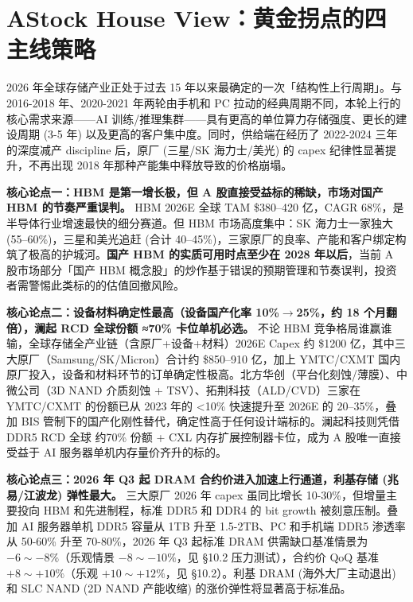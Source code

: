 
\section{AStock House View：黄金拐点的四主线策略}

2026 年全球存储产业正处于过去 15 年以来最确定的一次「结构性上行周期」。与 2016-2018 年、2020-2021 年两轮由手机和 PC 拉动的经典周期不同，本轮上行的核心需求来源——AI 训练/推理集群——具有更高的单位算力存储强度、更长的建设周期 (3-5 年) 以及更高的客户集中度。同时，供给端在经历了 2022-2024 三年的深度减产 discipline 后，原厂 (三星/SK 海力士/美光) 的 capex 纪律性显著提升，不再出现 2018 年那种产能集中释放导致的价格崩塌。

\begin{houseviewbox}
\vspace{0.3em}
\sloppy
\textbf{核心论点一：HBM 是第一增长极，但 A 股直接受益标的稀缺，市场对国产 HBM 的节奏严重误判。}
HBM 2026E 全球 TAM \$380--420 亿，CAGR 68\%，是半导体行业增速最快的细分赛道。但 HBM 市场高度集中：SK 海力士一家独大 (55--60\%)，三星和美光追赶 (合计 40--45\%)，三家原厂的良率、产能和客户绑定构筑了极高的护城河。\textbf{国产 HBM 的实质可用时点至少在 2028 年以后}，当前 A 股市场部分「国产 HBM 概念股」的炒作基于错误的预期管理和节奏误判，投资者需警惕此类标的的估值回撤风险。\par
\vspace{0.3em}
\textbf{核心论点二：设备材料确定性最高（设备国产化率 10\%\(\to\)25\%，约 18 个月翻倍），澜起 RCD 全球份额 ≈70\% 卡位单机必选。}
不论 HBM 竞争格局谁赢谁输，全球存储全产业链（含原厂+设备+材料）2026E Capex 约 \$1200 亿，其中三大原厂（Samsung\slash SK\slash Micron）合计约 \$850--910 亿，加上 YMTC\slash CXMT 国内原厂投入，设备和材料环节的订单确定性极高。北方华创（平台化刻蚀/薄膜）、中微公司（3D NAND 介质刻蚀 + TSV）、拓荆科技（ALD/CVD）三家在 YMTC\slash CXMT 的份额已从 2023 年的 <10\% 快速提升至 2026E 的 20--35\%，叠加 BIS 管制下的国产化刚性替代，确定性高于任何设计端标的。澜起科技则凭借 DDR5 RCD 全球 约70\% 份额 + CXL 内存扩展控制器卡位，成为 A 股唯一直接受益于 AI 服务器单机内存量价齐升的标的。\par
\vspace{0.3em}
\textbf{核心论点三：2026 年 Q3 起 DRAM 合约价进入加速上行通道，利基存储 (兆易/江波龙) 弹性最大。}
三大原厂 2026 年 capex 虽同比增长 10-30\%，但增量主要投向 HBM 和先进制程，标准 DDR5 和 DDR4 的 bit growth 被刻意压制。叠加 AI 服务器单机 DDR5 容量从 1TB 升至 1.5-2TB、PC 和手机端 DDR5 渗透率从 50-60\% 升至 70-80\%，2026 年 Q3 起标准 DRAM 供需缺口基准情景为 \(-6\sim-8\%\)（乐观情景 \(-8\sim-10\%\)，见 §10.2 压力测试），合约价 QoQ 基准 \(+8\sim+10\%\)（乐观 \(+10\sim+12\%\)，见 §10.2）。利基 DRAM (海外大厂主动退出) 和 SLC NAND (2D NAND 产能收缩) 的涨价弹性将显著高于标准品。\par

\end{houseviewbox}

